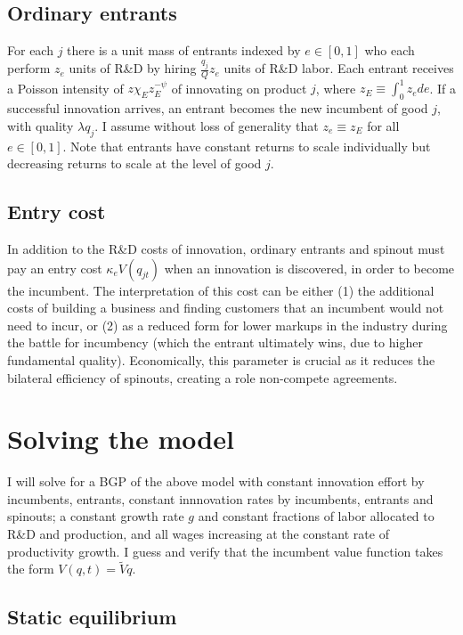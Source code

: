 \documentclass[12pt,english]{article}
\theoremstyle{remark}
\begin{document}
\subsection{Ordinary entrants}

For each $j$ there is a unit mass of entrants indexed by $e \in [0,1]$ who each perform $z_e$ units of R\&D by hiring $\frac{q_j}{Q} z_e$ units of R\&D labor. Each entrant receives a Poisson intensity of $z \chi_E z_E^{-\psi}$ of innovating on product $j$, where $z_E \equiv \int_0^1 z_e de$. If a successful innovation arrives, an entrant becomes the new incumbent of good $j$, with quality $\lambda q_j$. I assume without loss of generality that $z_e \equiv z_E$ for all $e \in [0,1]$. Note that entrants have constant returns to scale individually but decreasing returns to scale at the level of good $j$. 


\subsection{Entry cost}

In addition to the R\&D costs of innovation, ordinary entrants and spinout must pay an entry cost $\kappa_{e} V(q_{jt})$ when an innovation is discovered, in order to become the incumbent. The interpretation of this cost can be either (1) the additional costs of building a business and finding customers that an incumbent would not need to incur, or (2) as a reduced form for lower markups in the industry during the battle for incumbency (which the entrant ultimately wins, due to higher fundamental quality). Economically, this parameter is crucial as it reduces the bilateral efficiency of spinouts, creating a role non-compete agreements. 


\section{Solving the model}

I will solve for a BGP of the above model with constant innovation effort by incumbents, entrants, constant innnovation rates by incumbents, entrants and spinouts; a constant growth rate $g$ and constant fractions of labor allocated to R\&D and production, and all wages increasing at the constant rate of productivity growth. I guess and verify that the incumbent value function takes the form $V(q,t) = \tilde{V}q$. 

\subsection{Static equilibrium}
\end{document}

